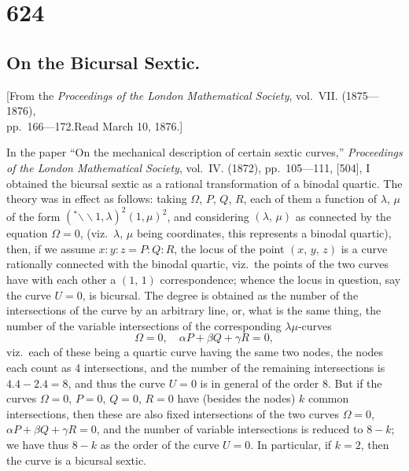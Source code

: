 \documentclass[11pt,a4paper]{book}
\begin{document}
\newpage

\section*{624}
\subsection*{On the Bicursal Sextic.}

\begin{center}
\small
[From the \textit{Proceedings of the London Mathematical Society}, vol.~VII. (1875---1876),\\
pp.~166---172.\quad Read March 10, 1876.]
\end{center}

\medskip
\noindent
In the paper ``On the mechanical description of certain sextic curves,'' \textit{Proceedings of the London Mathematical Society}, vol.~IV. (1872), pp.~105---111, [504], I obtained the bicursal sextic as a rational transformation of a binodal quartic. The theory was in effect as follows: taking $\Omega$, $P$, $Q$, $R$, each of them a function of $\lambda$, $\mu$ of the form $({}^*\!\!\mathbin{\backslash\!\!\backslash}\! 1,\lambda)^2(1,\mu)^2$, and considering $(\lambda,\,\mu)$ as connected by the equation $\Omega=0$, (viz.\ $\lambda$, $\mu$ being coordinates, this represents a binodal quartic), then, if we assume $x:y:z = P:Q:R$, the locus of the point $(x,\,y,\,z)$ is a curve rationally connected with the binodal quartic, viz.\ the points of the two curves have with each other a $(1,\,1)$ correspondence; whence the locus in question, say the curve $U=0$, is bicursal. The degree is obtained as the number of the intersections of the curve by an arbitrary line, or, what is the same thing, the number of the variable intersections of the corresponding $\lambda\mu$-curves
\[
\Omega = 0, \quad \alpha P + \beta Q + \gamma R = 0,
\]
viz.\ each of these being a quartic curve having the same two nodes, the nodes each count as 4 intersections, and the number of the remaining intersections is $4.4 - 2.4 = 8$, and thus the curve $U=0$ is in general of the order 8. But if the curves $\Omega=0$, $P=0$, $Q=0$, $R=0$ have (besides the nodes) $k$ common intersections, then these are also fixed intersections of the two curves $\Omega=0$, $\alpha P+\beta Q+\gamma R=0$, and the number of variable intersections is reduced to $8-k$; we have thus $8-k$ as the order of the curve $U=0$. In particular, if $k=2$, then the curve is a bicursal sextic.
\end{document}
